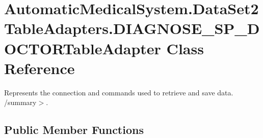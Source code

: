 \section{AutomaticMedicalSystem.DataSet2TableAdapters.DIAGNOSE\_\-SP\_\-DOCTORTableAdapter Class Reference}
\label{class_automatic_medical_system_1_1_data_set2_table_adapters_1_1_d_i_a_g_n_o_s_e___s_p___d_o_c_t_o_r_table_adapter}
Represents the connection and commands used to retrieve and save data. /summary$>$.  


\subsection*{Public Member Functions}
